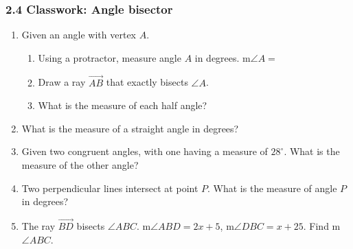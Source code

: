 

\fancyhead[LE]{\thepage}



\subsubsection*{2.4 Classwork: Angle bisector}
\begin{enumerate}
\item Given an angle with vertex $A$.
  \begin{enumerate}[itemsep=0.3cm]
    \item Using a protractor, measure angle $A$ in degrees. m$\angle A =$
    \item Draw a ray $\overrightarrow{AB}$ that exactly bisects $\angle A$.
    \item What is the measure of each half angle?
  \end{enumerate}
  \begin{center}
  \end{center} \vspace{0.5cm}

\item What is the measure of a straight angle in degrees?
\item Given two congruent angles, with one having a measure of $28^\circ$. What is the measure of the other angle?
\item Two perpendicular lines intersect at point $P$. What is the measure of angle $P$ in degrees? \vspace{0.5cm}

\item The ray $\overrightarrow{BD}$ bisects $\angle ABC$. m$\angle ABD=2x+5$, m$\angle DBC=x+25$. Find m$\angle ABC$.\vspace{0.2cm}
  \begin{flushright}
  \end{flushright}


\end{enumerate}
